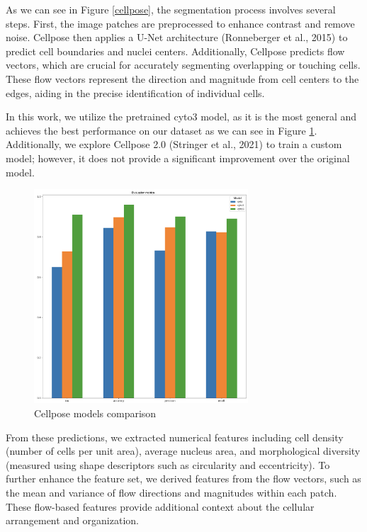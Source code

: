 \documentclass[10pt,twocolumn]{article}
\begin{document}
As we can see in Figure \ref{cellpose}, the segmentation process involves several steps. First, the image patches are preprocessed to enhance contrast and remove noise. Cellpose then applies a U-Net architecture (Ronneberger et al., 2015)\cite{ronneberger2015unetconvolutionalnetworksbiomedical} to predict cell boundaries and nuclei centers. Additionally, Cellpose predicts flow vectors, which are crucial for accurately segmenting overlapping or touching cells. These flow vectors represent the direction and magnitude from cell centers to the edges, aiding in the precise identification of individual cells.

In this work, we utilize the pretrained cyto3 model, as it is the most general and achieves the best performance on our dataset as we can see in Figure \ref{cellpose_models_comparison}. Additionally, we explore Cellpose 2.0 (Stringer et al., 2021) \cite{stringer2021cellpose} to train a custom model; however, it does not provide a significant improvement over the original model.
\begin{figure}[!htb]
\centering
\includegraphics[width=\linewidth, height=8cm]{images/comparison_between_cellpose_models.png}
\caption{Cellpose models comparison} 
\label{cellpose_models_comparison}
\end{figure}

From these predictions, we extracted numerical features including cell density (number of cells per unit area), average nucleus area, and morphological diversity (measured using shape descriptors such as circularity and eccentricity). To further enhance the feature set, we derived features from the flow vectors, such as the mean and variance of flow directions and magnitudes within each patch. These flow-based features provide additional context about the cellular arrangement and organization.
\end{document}
